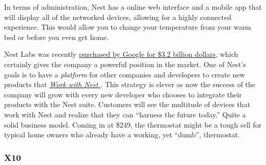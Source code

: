 In terms of administration, Nest has a online web interface and a mobile app
that will display all of the networked devices, allowing for a highly connected
experience. This would allow you to change your temperature from your warm bed
or before you even get home.

Nest Labs was recently
\href{http://www.forbes.com/sites/greatspeculations/2014/01/17/googles-strategy-behind-the-3-2-billion-acquisition-of-nest-labs/}{purchased by Google for \$3.2 billion dollars},
which certainly gives the company a powerful position in the market. One of
Nest's goals is to have a \emph{platform} for other companies and developers to
create new products that \href{https://nest.com/works-with-nest/}{\emph{Work with Nest \texttrademark}}. This strategy is
clever as now the success of the company will grow with every new
developer who chooses to integrate their products with the Nest suite.
Customers will see the multitude of devices that work with Nest and realize
that they can ``harness the future today.'' Quite a solid business model.
Coming in at \$249, the thermostat might be a tough sell for typical home owners who
already have a working, yet ``dumb'', thermostat.

\subsubsection{X10}

